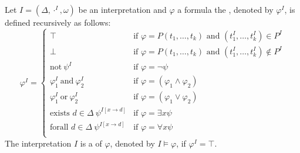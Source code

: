 \begin{definition}
Let $I=(\Delta,\cdot^I,\omega)$ be an interpretation and $\varphi$ a formula the , denoted by $\varphi^I$, is defined recursively as follows:
\[\varphi^I=
\begin{cases}
\top & \text{if $\varphi=P(t_1,\dots,t_k)$ and $(t^I_1,\dots,t^I_k)\in P^I$}\\
\bot & \text{if $\varphi=P(t_1,\dots,t_k)$ and $(t^I_1,\dots,t^I_k)\notin P^I$}\\
\text{not}~\psi^I & \text{if $\varphi=\neg\psi$}\\
\varphi^I_1~\text{and}~\varphi^I_2 & \text{if $\varphi=(\varphi_1\wedge\varphi_2)$}\\
\varphi^I_1~\text{or}~\varphi^I_2 & \text{if $\varphi=(\varphi_1\vee\varphi_2)$}\\
\text{exists $d\in\Delta$}~\psi^{I\left[x\to d\right]} & \text{if $\varphi=\exists x\psi$}\\
\text{forall $d\in\Delta$}~\psi^{I\left[x\to d\right]} & \text{if $\varphi=\forall x\psi$}\\
\end{cases}\]
The interpretation $I$ is a  of $\varphi$, denoted by $I\models\varphi$, if $\varphi^I=\top$.
\end{definition}
